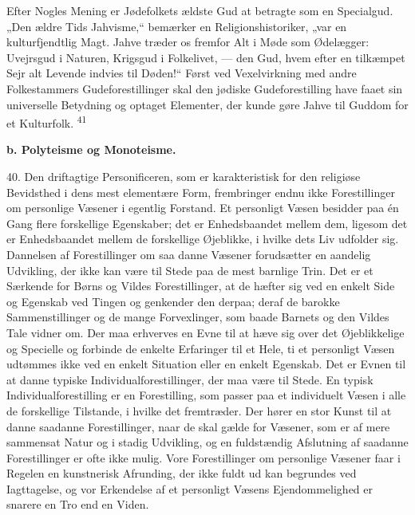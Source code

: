 \documentclass[12pt,a4paper,openany]{book}
\newcommand{\opage}[1]{\marginnote{\footnotesize\textit{[#1]}}}
\begin{document}
Efter Nogles Mening er Jødefolkets ældste Gud at betragte som en
Specialgud. „Den ældre Tids Jahvisme,“ bemærker en Religionshistoriker,
„var en kulturfjendtlig Magt. Jahve træder os fremfor Alt i Møde som
Ødelægger: Uvejrsgud i Naturen, Krigsgud i Folkelivet, --- den Gud, hvem
efter en tilkæmpet Sejr alt Levende indvies til Døden!“ Først ved
Vexelvirkning med andre Folkestammers Gudeforestillinger skal den
jødiske Gudeforestilling have faaet sin universelle Betydning og optaget
Elementer, der kunde gøre Jahve til Guddom for et Kulturfolk.
\textsuperscript{41}

\begin{center}\textbf{b. Polyteisme og Monoteisme.}\end{center}

40. Den driftagtige Personificeren, som er karakteristisk for den
religiøse Bevidsthed i dens mest elementære Form, frembringer endnu ikke
Forestillinger om personlige Væsener i egentlig Forstand. Et personligt
Væsen besidder paa én Gang flere forskellige Egenskaber; det er
Enhedsbaandet mellem dem, ligesom det er Enhedsbaandet mellem de
forskellige Øjeblikke, i hvilke dets Liv udfolder sig. Dannelsen af
Forestillinger om saa%
\opage{93}danne Væsener forudsætter en aandelig Udvikling, der ikke kan
være til Stede paa de mest barnlige Trin. Det er et Særkende for Børns
og Vildes Forestillinger, at de hæfter sig ved en enkelt Side og
Egenskab ved Tingen og genkender den derpaa; deraf de barokke
Sammenstillinger og de mange Forvexlinger, som baade Barnets og den
Vildes Tale vidner om. Der maa erhverves en Evne til at hæve sig over
det Øjeblikkelige og Specielle og forbinde de enkelte Erfaringer til et
Hele, ti et personligt Væsen udtømmes ikke ved en enkelt Situation eller
en enkelt Egenskab. Det er Evnen til at danne typiske
Individualforestillinger, der maa være til Stede. En typisk
Individualforestilling er en Forestilling, som passer paa et individuelt
Væsen i alle de forskellige Tilstande, i hvilke det fremtræder. Der
hører en stor Kunst til at danne saadanne Forestillinger, naar de skal
gælde for Væsener, som er af mere sammensat Natur og i stadig Udvikling,
og en fuldstændig Afslutning af saadanne Forestillinger er ofte ikke
mulig. Vore Forestillinger om personlige Væsener faar i Regelen en
kunstnerisk Afrunding, der ikke fuldt ud kan begrundes ved Iagttagelse,
og vor Erkendelse af et personligt Væsens Ejendommelighed er snarere en
Tro end en Viden.
\end{document}
